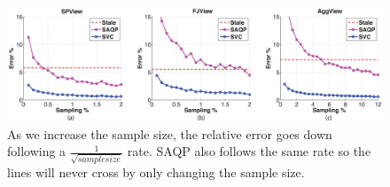 \begin{figure}[ht!]
 \includegraphics[trim = 45mm 0mm 45mm 0mm, clip,width=\columnwidth]{exp/exp1-samplesize-accuracy.eps}\vspace{-1em}
 \caption{As we increase the sample size, the relative error goes down following a $\frac{1}{\sqrt{samplesize}}$ rate. SAQP also follows the same rate so the lines will never cross by only changing the sample size. \label{exp1sample} }\vspace{-1em}
\end{figure}

